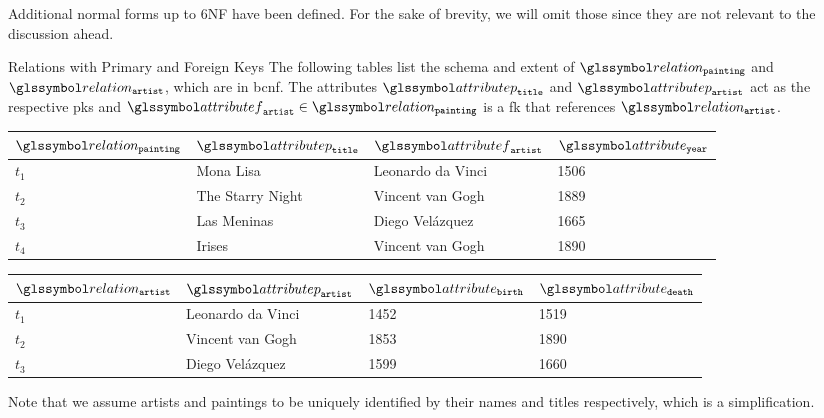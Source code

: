 Additional normal forms up to 6NF have been defined. For the sake of brevity, we will omit those since they are not relevant to the discussion ahead. 

\begin{example}[label=example:relational_table_pkfk]{Relations with Primary and Foreign Keys}{}
    The following tables list the schema and extent of $\relation_{\mathtt{painting}}$ and $\relation_{\mathtt{artist}}$, which are in \acrshort{bcnf}. The attributes $\attributep_{\mathtt{title}}$ and  $\attributep_{\mathtt{artist}}$ act as the respective \acrshort{pk}s and  $\attributef_{\mathtt{artist}} \in \relation_{\mathtt{painting}}$ is a \acrshort{fk} that references $\relation_{\mathtt{artist}}$.
    \begin{center}
        \begin{tabular}{ l || l | l | l |}
            $\relation_{\mathtt{painting}}$ & $\attributep_{\mathtt{title}}$  & $\attributef_{\mathtt{artist}}$  & $\attribute_{\mathtt{year}}$ \\ 
            \hline
            \hline
            $t_1$ & Mona Lisa &  Leonardo da Vinci & 1506 \\
            \hline
            $t_2$ & The Starry Night & Vincent van Gogh & 1889 \\
            \hline
            $t_3$ & Las Meninas & Diego Velázquez & 1665 \\
            \hline
            $t_4$ & Irises & Vincent van Gogh & 1890 \\
            \hline
        \end{tabular}
    \end{center}

    \begin{center}
        \begin{tabular}{ l || l | l | l |}
            $\relation_{\mathtt{artist}}$ & $\attributep_{\mathtt{artist}}$ & $\attribute_{\mathtt{birth}}$ & $\attribute_{\mathtt{death}}$\\ 
            \hline
            \hline
            $t_1$ & Leonardo da Vinci & 1452 & 1519 \\
            \hline
            $t_2$ & Vincent van Gogh & 1853 & 1890 \\
            \hline
            $t_3$ & Diego Velázquez & 1599 & 1660 \\
            \hline
        \end{tabular}
    \end{center}

    Note that we assume artists and paintings to be uniquely identified by their names and titles respectively, which is a simplification.
\end{example}

